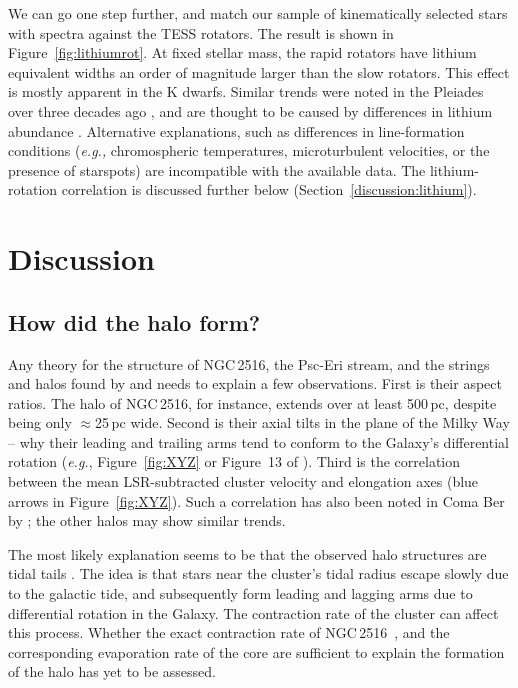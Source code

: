 \documentclass[12pt,twocolumn,tighten]{aastex63}
\newcommand{\cn}{NGC\,2516} %
\begin{document}
We can go one step further, and match our sample of kinematically
selected stars with spectra against the TESS rotators.  The result is
shown in Figure~\ref{fig:lithiumrot}. At fixed stellar mass, the rapid
rotators have lithium equivalent widths an order of magnitude larger
than the slow rotators.  This effect is mostly apparent in the K
dwarfs.  Similar trends were noted in the Pleiades over three decades
ago \citep{butler_pleiades_1987}, and are thought to be caused by
differences in lithium abundance
\citep{soderblom_evolution_1993}.  Alternative explanations, such as
differences in line-formation conditions ({\it e.g.,} chromospheric
temperatures, microturbulent velocities, or the presence of starspots)
are incompatible with the available data.  The lithium-rotation
correlation is discussed further below
(Section~\ref{discussion:lithium}).




\section{Discussion}
\label{sec:discussion}

\subsection{How did the halo form?}
\label{subsec:origin}


Any theory for the structure of \cn, the Psc-Eri stream, and the
strings and halos found by  and
 needs to explain a few observations.  First
is their aspect ratios.  The halo of \cn, for instance, extends over
at least 500\,pc, despite being only $\approx$25\,pc wide.  Second is
their axial tilts in the plane of the Milky Way -- why their leading
and trailing arms tend to conform to the Galaxy's differential
rotation ({\it e.g.}, Figure~\ref{fig:XYZ} or Figure~13 of
).  Third is the correlation between the
mean LSR-subtracted cluster velocity and elongation axes (blue arrows
in Figure~\ref{fig:XYZ}).  Such a correlation has also been noted in
Coma Ber by \citet{tang_comaber_2019}; the other halos may show
similar trends.

The most likely explanation seems to be that the observed halo
structures are tidal tails \citep[{\it
e.g.},][]{chumak_tails_2006,krumholz_star_2019}. The idea is that
stars near the cluster's tidal radius escape slowly due to the
galactic tide, and subsequently form leading and lagging arms due to
differential rotation in the Galaxy.  The contraction rate of the
cluster can affect this process.  Whether the exact contraction rate
of \cn\ \citep{healy_stellar_2020}, and the corresponding evaporation
rate of the core are sufficient to explain the formation of the halo
has yet to be assessed. 
\end{document}
